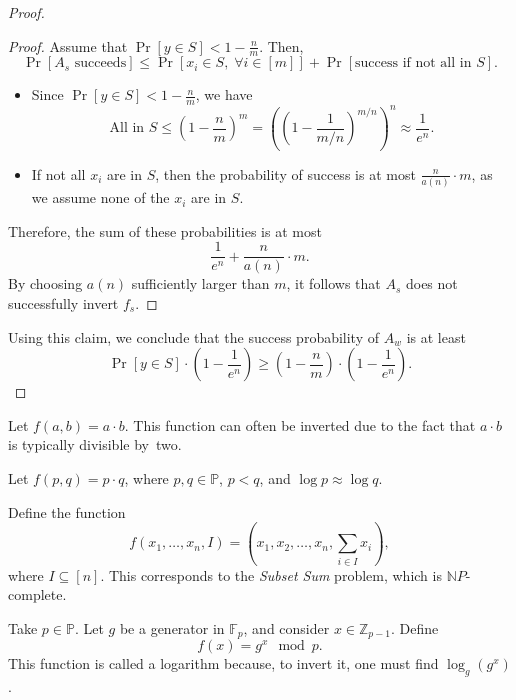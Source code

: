 \begin{proof}
    \begin{proof}
        Assume that $\Pr[y \in S] < 1 - \frac{n}{m}$.
        Then,
        \[
            \Pr[A_s \text{ succeeds}] \leq \Pr[x_i \in S, \; \forall i \in [m]] + \Pr[\text{success if not all in } S].
        \]
        \begin{itemize}
            \item Since $\Pr[y \in S] < 1 - \frac{n}{m}$, we have 
            \[
                \text{All in } S \leq \left( 1 - \frac{n}{m} \right)^{m}  = \left(\left(1 - \frac{1}{m/n}\right)^{m/n}\right)^n \approx \frac{1}{e^n}.
            \]
            \item If not all $x_i$ are in $S$, then the probability of success is at most $\frac{n}{a(n)} \cdot m$, as we assume none of the $x_i$ are in $S$.
        \end{itemize}
        Therefore, the sum of these probabilities is at most
        \[
            \frac{1}{e^{n}} + \frac{n}{a(n)} \cdot m.
        \]
        By choosing $a(n)$ sufficiently larger than $m$, it follows that $A_s$ does not successfully invert $f_s$.
    \end{proof}

    Using this claim, we conclude that the success probability of $A_w$ is at least
    \[
        \Pr[y \in S] \cdot \left(1 - \frac{1}{e^{n}}\right) \ge \left(1 - \frac{n}{m}\right) \cdot \left(1 - \frac{1}{e^{n}}\right).
    \]
\end{proof}

\begin{example}
    Let $f(a, b) = a \cdot b$.
    This function can often be inverted due to the fact that $a \cdot b$ is typically divisible by~two.
\end{example}

\begin{example}
    Let $f(p, q) = p \cdot q$, where $p, q \in \mathbb{P}$, $p < q$, and $\log p \approx \log q$.
\end{example}

\begin{example}
    Define the function
    \[
        f(x_1, \ldots, x_n, I) = (x_1, x_2, \ldots, x_n, \sum_{i \in I} x_i),
    \]
    where $I \subseteq [n]$.
	This corresponds to the \emph{Subset Sum} problem, which is $\mathbb{N}P$-complete.
\end{example}

\begin{example}
    Take $p \in \mathbb{P}$.
    Let $g$ be a generator in $\mathbb{F}_p$, and consider $x \in \mathbb{Z}_{p - 1}$.
    Define
    \[
        f(x) = g^x \mod p.
    \]
    This function is called a logarithm because, to invert it, one must find $\log_g(g^x)$.
\end{example}

